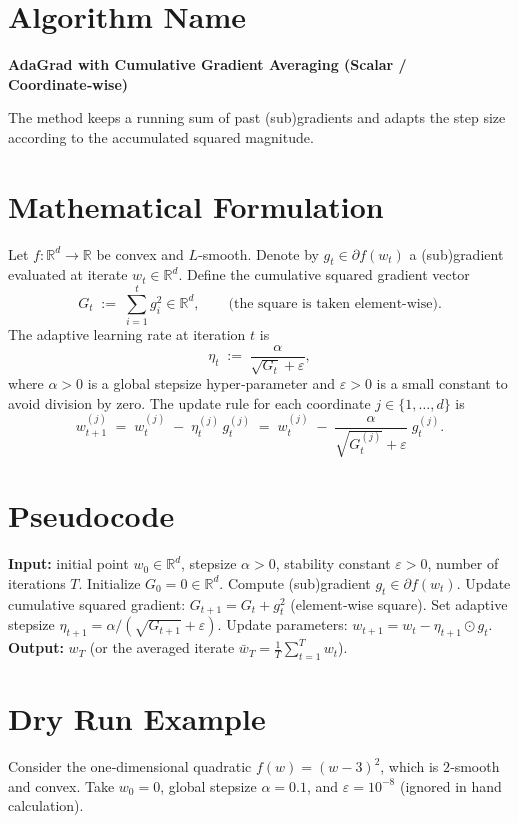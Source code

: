 \documentclass[11pt]{article}
\newcommand{\R}{\mathbb{R}}
\begin{document}
\section*{Algorithm Name}
\textbf{AdaGrad with Cumulative Gradient Averaging (Scalar / Coordinate‑wise)}  

The method keeps a running sum of past (sub)gradients and adapts the step size according to the accumulated squared magnitude.

\section*{Mathematical Formulation}
Let $f:\R^{d}\rightarrow\R$ be convex and $L$‑smooth.  
Denote by $g_{t}\in\partial f(w_{t})$ a (sub)gradient evaluated at iterate $w_{t}\in\R^{d}$.  
Define the cumulative squared gradient vector
\[
G_{t}\;:=\;\sum_{i=1}^{t} g_{i}^{2}\in\R^{d},
\qquad\text{(the square is taken element‑wise).}
\]
The adaptive learning rate at iteration $t$ is
\[
\eta_{t}\;:=\;\frac{\alpha}{\sqrt{G_{t}}+\varepsilon},
\]
where $\alpha>0$ is a global stepsize hyper‑parameter and $\varepsilon>0$ is a small constant to avoid division by zero.  
The update rule for each coordinate $j\in\{1,\dots,d\}$ is
\[
w_{t+1}^{(j)}\;=\;w_{t}^{(j)}\;-\;\eta_{t}^{(j)}\,g_{t}^{(j)}
\;=\;w_{t}^{(j)}\;-\;\frac{\alpha}{\sqrt{G_{t}^{(j)}}+\varepsilon}\;g_{t}^{(j)} .
\tag{1}
\]

\section*{Pseudocode}
\begin{algorithm}[H]
\caption{AdaGrad with Cumulative Gradient Averaging}
\begin{algorithmic}[1]
\STATE \textbf{Input:} initial point $w_{0}\in\R^{d}$, stepsize $\alpha>0$, stability constant $\varepsilon>0$, number of iterations $T$.
\STATE Initialize $G_{0}=0\in\R^{d}$.
    \STATE Compute (sub)gradient $g_{t}\in\partial f(w_{t})$.
    \STATE Update cumulative squared gradient: $G_{t+1}=G_{t}+g_{t}^{2}$ (element‑wise square).
    \STATE Set adaptive stepsize $\eta_{t+1}=\alpha/(\sqrt{G_{t+1}}+\varepsilon)$.
    \STATE Update parameters: $w_{t+1}=w_{t}-\eta_{t+1}\odot g_{t}$.
\ENDFOR
\STATE \textbf{Output:} $w_{T}$ (or the averaged iterate $\bar w_{T}=\frac1T\sum_{t=1}^{T}w_{t}$).
\end{algorithmic}
\end{algorithm}

\section*{Dry Run Example}
Consider the one‑dimensional quadratic $f(w)=(w-3)^{2}$, which is $2$‑smooth and convex.  
Take $w_{0}=0$, global stepsize $\alpha=0.1$, and $\varepsilon=10^{-8}$ (ignored in hand calculation).  
\end{document}
